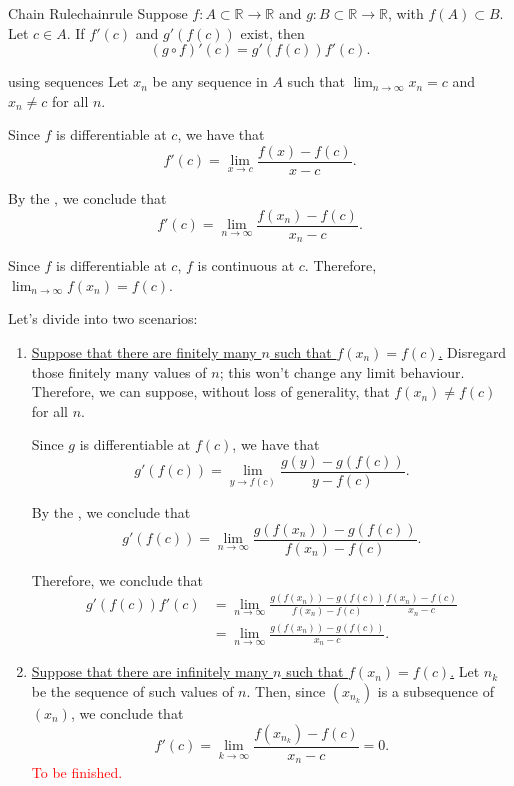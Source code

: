 
\begin{thm}{Chain Rule}{chainrule}
	Suppose \(f\colon A \subset \mathbb{R} \to \mathbb{R}\) and \(g\colon B \subset \mathbb{R} \to \mathbb{R}\), with \(f(A) \subset B\). Let \(c \in A\). If \(f'(c)\) and \(g'(f(c))\) exist, then \[
		(g\circ f)'(c) = g'(f(c)) f'(c).
	\]
\end{thm}

\begin{dem}{using sequences}{}
	Let \(x_n\) be any sequence in \(A\) such that \(\lim_{n \to \infty} x_n = c\) and \(x_n \neq c\) for all \(n\).

	Since \(f\) is differentiable at \(c\), we have that \[
		f'(c) = \lim_{x \to c} \frac{f(x) - f(c)}{x - c}.
	\]

	By the , we conclude that \[
		f'(c) = \lim_{n \to \infty} \frac{f(x_n) - f(c)}{x_n - c}.
	\]

	Since \(f\) is differentiable at \(c\), \(f\) is continuous at \(c\). Therefore, \(\lim_{n \to \infty} f(x_n) = f(c)\).

	Let's divide into two scenarios:

	\begin{enumerate}[label = \textbullet]
		\item \underline{Suppose that there are finitely many \(n\) such that \(f(x_n) = f(c)\).} Disregard those finitely many values of \(n\); this won't change any limit behaviour. Therefore, we can suppose, without loss of generality, that \(f(x_n) \neq f(c)\) for all \(n\).

			Since \(g\) is differentiable at \(f(c)\), we have that \[
				g'(f(c)) = \lim_{y \to f(c)} \frac{g(y) - g(f(c))}{y - f(c)}.
			\]

			By the , we conclude that \[
				g'(f(c)) = \lim_{n \to \infty} \frac{g(f(x_n)) - g(f(c))}{f(x_n) - f(c)}.
			\]
			
			Therefore, we conclude that 
			\begin{align*}
				g'(f(c)) f'(c) &= \lim_{n \to \infty} \frac{g(f(x_n)) - g(f(c))}{f(x_n) - f(c)} \frac{f(x_n) - f(c)}{x_n - c} \\
							   &= \lim_{n \to \infty} \frac{g(f(x_n)) - g(f(c))}{x_n - c}.
			\end{align*}

		\item \underline{Suppose that there are infinitely many \(n\) such that \(f(x_n) = f(c)\).} Let \(n_k\) be the sequence of such values of \(n\). Then, since \((x_{n_k})\) is a subsequence of \((x_n)\), we conclude that \[
				f'(c) = \lim_{k \to \infty} \frac{f(x_{n_k}) - f(c)}{x_n - c} = 0.
		\]
		\textcolor{red}{To be finished.}
	\end{enumerate}


\end{dem}
